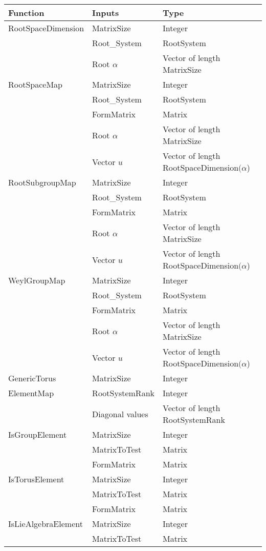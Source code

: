 \documentclass[12pt]{article}
\theoremstyle{definition}
\numberwithin{theorem}{subsection}
\begin{document}
\newpage
\begin{center}
	\begin{tabular}{l|l|l}
		Function & Inputs & Type \\
		\hline
		RootSpaceDimension & MatrixSize & Integer \\
		& Root\_System & RootSystem \\
		& Root $\alpha$ & Vector of length MatrixSize \\
		\hline
		RootSpaceMap & MatrixSize & Integer \\
		& Root\_System & RootSystem \\
		& FormMatrix & Matrix \\
		& Root $\alpha$ & Vector of length MatrixSize \\
		& Vector $u$ & Vector of length RootSpaceDimension$(\alpha$) \\
		\hline
		RootSubgroupMap & MatrixSize & Integer \\
		& Root\_System & RootSystem \\
		& FormMatrix & Matrix \\
		& Root $\alpha$ & Vector of length MatrixSize \\
		& Vector $u$ & Vector of length RootSpaceDimension$(\alpha$)  \\
		\hline
		WeylGroupMap &  MatrixSize & Integer \\
		& Root\_System & RootSystem \\
		& FormMatrix & Matrix \\
		& Root $\alpha$ & Vector of length MatrixSize \\
		& Vector $u$ & Vector of length RootSpaceDimension$(\alpha$)  \\
		\hline
		GenericTorus & MatrixSize & Integer \\
		ElementMap  & RootSystemRank & Integer \\
		& Diagonal values & Vector of length RootSystemRank \\
		\hline
		IsGroupElement & MatrixSize & Integer \\
		& MatrixToTest & Matrix \\
		& FormMatrix & Matrix \\
		\hline
		IsTorusElement & MatrixSize & Integer \\
		& MatrixToTest & Matrix \\
		& FormMatrix & Matrix \\
		\hline
		IsLieAlgebraElement &  MatrixSize & Integer \\
		& MatrixToTest & Matrix \\

\end{tabular}
\end{center}
\end{document}
